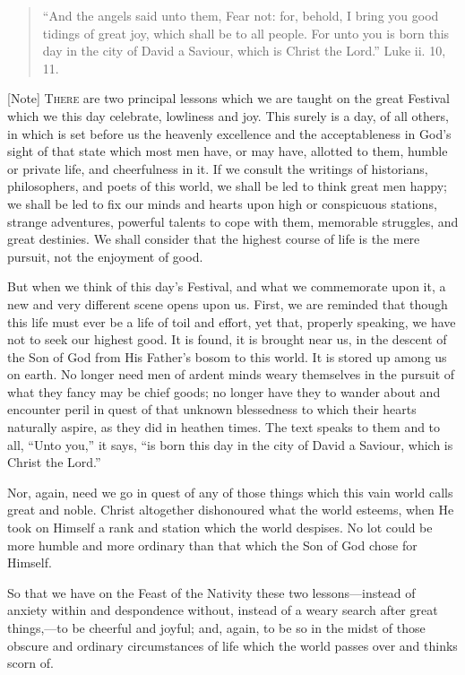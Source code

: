 
\begin{quote}

``And the angels said unto them, Fear not: for, behold, I
bring you good tidings of great joy, which shall be to all people.
For unto you is born this day in the city of David a Saviour, which
is Christ the Lord.'' Luke ii. 10, 11.

\end{quote}

[Note] T\textsc{here} are two principal lessons which we are taught on the great
Festival which we this day celebrate,
lowliness and joy. This surely is a day, of all others, in which is
set before us the heavenly excellence and the acceptableness in God's
sight of that state which most men have, or may have, allotted to
them, humble or private life, and cheerfulness in it. If we consult
the writings of historians, philosophers, and poets of this world, we
shall be led to think great men happy; we shall be led to fix our
minds and hearts upon high or conspicuous stations, strange
adventures, powerful talents to cope with them, memorable struggles,
and great destinies. We shall consider that the highest course of life
is the mere pursuit, not the enjoyment of good.

But when we think of this day's Festival, and what we commemorate
upon it, a new and very different scene opens upon us. First, we are
reminded that though this life must ever be a life of toil and effort,
yet that, properly speaking, we have not to seek our highest good. It
is found, it is brought near us, in the descent of the Son of God from
His Father's bosom to this world. It is stored up among us on earth.
No longer need men of ardent minds weary themselves in the pursuit of
what they fancy may be chief goods; no longer have they to wander
about and encounter peril in quest of that unknown blessedness to
which their hearts naturally aspire, as they did in heathen times. The
text speaks to them and to all, ``Unto you,'' it says,
``is born this day in the city of David a Saviour, which is Christ
the Lord.''

Nor, again, need we go in quest of any of those things which this
vain world calls great and noble. Christ altogether dishonoured what
the world esteems, when He took on Himself a rank and station which
the world despises. No lot could be more humble and more ordinary than
that which the Son of God chose for Himself.

So that we have on the Feast of the Nativity these two lessons—instead
of anxiety within and despondence without, instead of a weary search
after great things,—to be cheerful and joyful; and, again, to be so
in the midst of those obscure and ordinary circumstances of life which
the world passes over and thinks scorn of.

